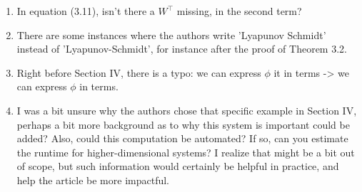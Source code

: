 \documentclass[letterpaper, 10 pt, conference, dvipsnames]{ieeeconf}
\begin{document}
\begin{enumerate}
\begin{enumerate}
        \item In equation (3.11), isn't there a $W^\top$ missing, in the second term? 
        \item There are some instances where the authors write 'Lyapunov Schmidt' instead of 'Lyapunov-Schmidt', for instance after the proof of Theorem 3.2. 
        \item Right before Section IV, there is a typo: we can express $\phi$ it in terms -> we can express $\phi$ in terms. 
        \item I was a bit unsure why the authors chose that specific example in Section IV, perhaps a bit more background as to why this system is important could be added? Also, could this computation be automated? If so, can you estimate the runtime for higher-dimensional systems? I realize that might be a bit out of scope, but such information would certainly be helpful in practice, and help the article be more impactful. 
    \end{enumerate}
\end{enumerate}



\end{document}
